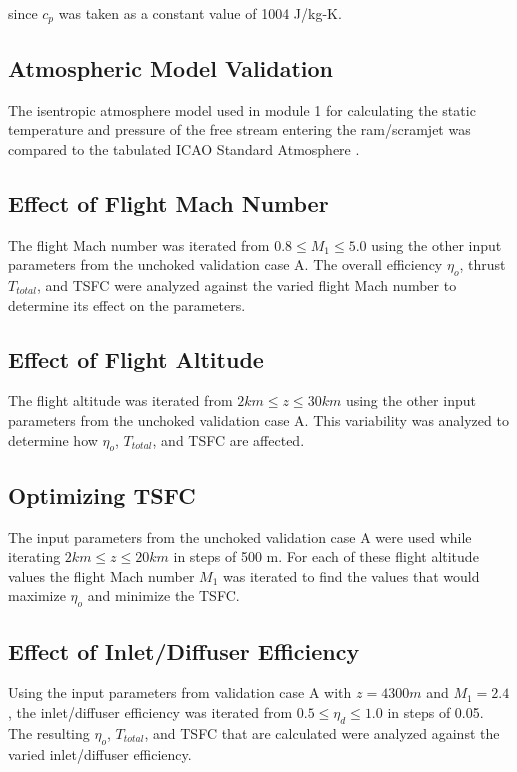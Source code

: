 \documentclass[conf]{new-aiaa} %
\begin{document}
since $c_p$ was taken as a constant value of 1004 J/kg-K.

\subsection{Atmospheric Model Validation} %
The isentropic atmosphere model used in module 1 for calculating the static temperature and pressure of the free stream entering the ram/scramjet was compared to the tabulated ICAO Standard Atmosphere \cite{hill1992propulsion}.

\subsection{Effect of Flight Mach Number} %
The flight Mach number was iterated from $0.8\leq M_1\leq 5.0$ using the other input parameters from the unchoked validation case A. The overall efficiency $\eta_o$, thrust $T_{total}$, and TSFC were analyzed against the varied flight Mach number to determine its effect on the parameters.

\subsection{Effect of Flight Altitude} %
The flight altitude was iterated from $2 km \leq z \leq 30 km$ using the other input parameters from the unchoked validation case A. This variability was analyzed to determine how $\eta_o$, $T_{total}$, and TSFC are affected.

\subsection{Optimizing TSFC} %
The input parameters from the unchoked validation case A were used while iterating $2 km \leq z \leq 20 km$ in steps of 500 m. For each of these flight altitude values the flight Mach number $M_1$ was iterated to find the values that would maximize $\eta_o$ and minimize the TSFC.

\subsection{Effect of Inlet/Diffuser Efficiency} %
Using the input parameters from validation case A with $z=4300m$ and $M_1=2.4$, the inlet/diffuser efficiency was iterated from $0.5\leq\eta_d\leq1.0$ in steps of 0.05. The resulting $\eta_o$, $T_{total}$, and TSFC that are calculated were analyzed against the varied inlet/diffuser efficiency.
\end{document}
